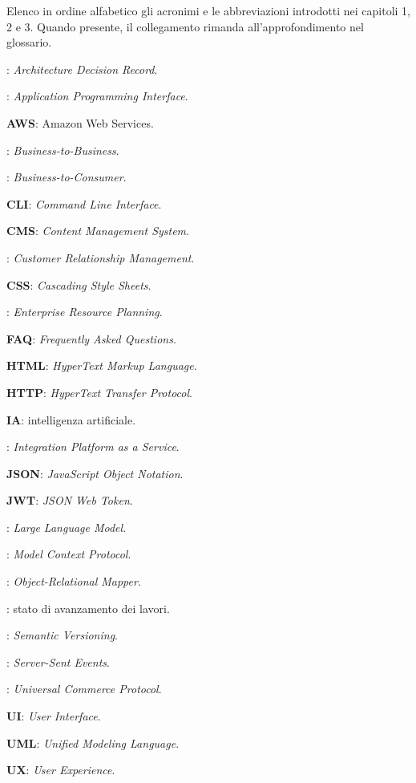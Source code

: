 

Elenco in ordine alfabetico gli acronimi e le abbreviazioni introdotti nei capitoli 1, 2 e 3. Quando
presente, il collegamento rimanda all’approfondimento nel glossario.

: \emph{Architecture Decision Record}.

: \emph{Application Programming Interface}.

\textbf{AWS}: Amazon Web Services.

: \emph{Business-to-Business}.

: \emph{Business-to-Consumer}.

\textbf{CLI}: \emph{Command Line Interface}.

\textbf{CMS}: \emph{Content Management System}.

: \emph{Customer Relationship Management}.

\textbf{CSS}: \emph{Cascading Style Sheets}.

: \emph{Enterprise Resource Planning}.

\textbf{FAQ}: \emph{Frequently Asked Questions}.

\textbf{HTML}: \emph{HyperText Markup Language}.

\textbf{HTTP}: \emph{HyperText Transfer Protocol}.

\textbf{IA}: intelligenza artificiale.

: \emph{Integration Platform as a Service}.

\textbf{JSON}: \emph{JavaScript Object Notation}.

\textbf{JWT}: \emph{JSON Web Token}.

: \emph{Large Language Model}.

: \emph{Model Context Protocol}.

: \emph{Object-Relational Mapper}.

: stato di avanzamento dei lavori.

: \emph{Semantic Versioning}.

: \emph{Server-Sent Events}.

: \emph{Universal Commerce Protocol}.

\textbf{UI}: \emph{User Interface}.

\textbf{UML}: \emph{Unified Modeling Language}.

\textbf{UX}: \emph{User Experience}.
